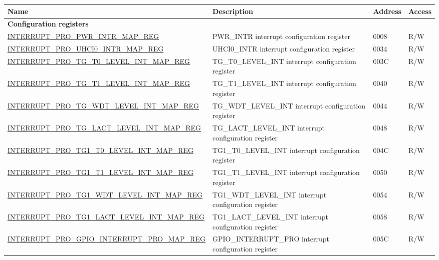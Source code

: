 
\begin{longtable}{ | m{9.3cm} | m{9.2cm} | m{1.3cm} | m{1.2cm} | }
\hline\rowcolor{lightgray}
Name & Description &  Address & Access \\ \hline
\endhead
\multicolumn{4}{|l|}{\textbf{Configuration registers}} \\ \hline
\hyperref[regdesc:INTERRUPTPROPWRINTRMAPREG]{INTERRUPT\_PRO\_PWR\_INTR\_MAP\_REG} & PWR\_INTR interrupt configuration register & \hexprefix{}0008 & R/W \\ \hline
\hyperref[regdesc:INTERRUPTPROUHCI0INTRMAPREG]{INTERRUPT\_PRO\_UHCI0\_INTR\_MAP\_REG} & UHCI0\_INTR interrupt configuration register & \hexprefix{}0034 & R/W \\ \hline
\hyperref[regdesc:INTERRUPTPROTGT0LEVELINTMAPREG]{INTERRUPT\_PRO\_TG\_T0\_LEVEL\_INT\_MAP\_REG} & TG\_T0\_LEVEL\_INT interrupt configuration register & \hexprefix{}003C & R/W \\ \hline
\hyperref[regdesc:INTERRUPTPROTGT1LEVELINTMAPREG]{INTERRUPT\_PRO\_TG\_T1\_LEVEL\_INT\_MAP\_REG} & TG\_T1\_LEVEL\_INT interrupt configuration register & \hexprefix{}0040 & R/W \\ \hline
\hyperref[regdesc:INTERRUPTPROTGWDTLEVELINTMAPREG]{INTERRUPT\_PRO\_TG\_WDT\_LEVEL\_INT\_MAP\_REG} & TG\_WDT\_LEVEL\_INT interrupt configuration register & \hexprefix{}0044 & R/W \\ \hline
\hyperref[regdesc:INTERRUPTPROTGLACTLEVELINTMAPREG]{INTERRUPT\_PRO\_TG\_LACT\_LEVEL\_INT\_MAP\_REG} & TG\_LACT\_LEVEL\_INT interrupt configuration register & \hexprefix{}0048 & R/W \\ \hline
\hyperref[regdesc:INTERRUPTPROTG1T0LEVELINTMAPREG]{INTERRUPT\_PRO\_TG1\_T0\_LEVEL\_INT\_MAP\_REG} & TG1\_T0\_LEVEL\_INT interrupt configuration register & \hexprefix{}004C & R/W \\ \hline
\hyperref[regdesc:INTERRUPTPROTG1T1LEVELINTMAPREG]{INTERRUPT\_PRO\_TG1\_T1\_LEVEL\_INT\_MAP\_REG} & TG1\_T1\_LEVEL\_INT interrupt configuration register & \hexprefix{}0050 & R/W \\ \hline
\hyperref[regdesc:INTERRUPTPROTG1WDTLEVELINTMAPREG]{INTERRUPT\_PRO\_TG1\_WDT\_LEVEL\_INT\_MAP\_REG} & TG1\_WDT\_LEVEL\_INT interrupt configuration register & \hexprefix{}0054 & R/W \\ \hline
\hyperref[regdesc:INTERRUPTPROTG1LACTLEVELINTMAPREG]{INTERRUPT\_PRO\_TG1\_LACT\_LEVEL\_INT\_MAP\_REG} & TG1\_LACT\_LEVEL\_INT interrupt configuration register & \hexprefix{}0058 & R/W \\ \hline
\hyperref[regdesc:INTERRUPTPROGPIOINTERRUPTPROMAPREG]{INTERRUPT\_PRO\_GPIO\_INTERRUPT\_PRO\_MAP\_REG} & GPIO\_INTERRUPT\_PRO interrupt configuration register & \hexprefix{}005C & R/W \\ \hline

\end{longtable}
